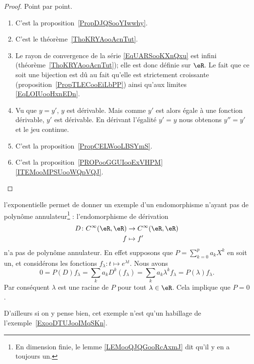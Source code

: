 	\begin{proof}
		Point par point.
		\begin{enumerate}
			\item
			      C'est la proposition~\ref{PropDJQSooYIwwhy}.
			\item
			      C'est le théorème~\ref{ThoKRYAooAcnTut}.
			\item
			      Le rayon de convergence de la série \eqref{EqUARSooKXnQxu} est infini (théorème~\ref{ThoKRYAooAcnTut}); elle est donc définie sur \( \eR\). Le fait que ce soit une bijection est dû au fait qu'elle est strictement croissante (proposition~\ref{PropTLECooEiLbPP}) ainsi qu'aux limites \eqref{EqLOIUooHxnEDn}.
			\item
			      Vu que \( y=y'\), \( y\) est dérivable. Mais comme \( y'\) est alors égale à une fonction dérivable, \( y'\) est dérivable. En dérivant l'égalité \( y'=y\) nous obtenons \( y''=y'\) et le jeu continue.
			\item
			      C'est la proposition~\ref{PropCELWooLBSYmS}.
			\item
			      C'est la proposition~\ref{PROPooGGUIooExVHPM}\ref{ITEMooMPSUooWQpVQJ}.
		\end{enumerate}
	\end{proof}

	\begin{example}     \label{ExooLRHCooMYLQTU}
		l'exponentielle permet de donner un exemple d'un endomorphisme n'ayant pas de polynôme annulateur\footnote{En dimension finie, le lemme \ref{LEMooQJQGooRcAxmJ} dit qu'il y en a toujours un.} : l'endomorphisme de dérivation
		\begin{equation}
			\begin{aligned}
				D\colon C^{\infty}(\eR,\eR) & \to  C^{\infty}(\eR,\eR) \\
				f                           & \mapsto f'
			\end{aligned}
		\end{equation}
		n'a pas de polynôme annulateur. En effet supposons que \( P=\sum_{k=0}^{p}a_kX^k\) en soit un, et considérons les fonctions \( f_{\lambda}\colon t\mapsto  e^{\lambda t}\). Nous avons
		\begin{equation}
			0=P(D)f_{\lambda}
			=\sum_ka_kD^k(f_{\lambda})
			=\sum_ka_k\lambda^kf_{\lambda}
			=P(\lambda)f_{\lambda}.
		\end{equation}
		Par conséquent \( \lambda\) est une racine de \( P\) pour tout \( \lambda\in \eR\). Cela implique que \( P=0\).

		D'ailleurs si on y pense bien, cet exemple n'est qu'un habillage de l'exemple~\ref{ExooDTUJooIMqSKn}.
	\end{example}

